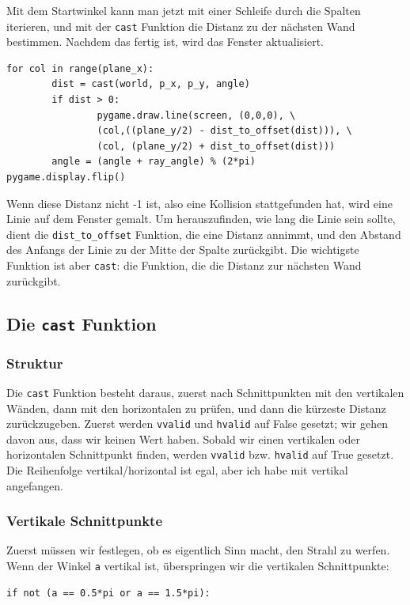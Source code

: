 \documentclass[a4paper,12pt]{report}
\begin{document}
Mit dem Startwinkel kann man jetzt mit einer Schleife durch die Spalten iterieren, und mit der \texttt{cast} Funktion die Distanz zu der n\"achsten Wand bestimmen. Nachdem das fertig ist, wird das Fenster aktualisiert.
\begin{Verbatim}[baselinestretch=1.0, xleftmargin=1cm]
for col in range(plane_x):
        dist = cast(world, p_x, p_y, angle)
        if dist > 0:
                pygame.draw.line(screen, (0,0,0), \
                (col,((plane_y/2) - dist_to_offset(dist))), \
                (col, (plane_y/2) + dist_to_offset(dist)))
        angle = (angle + ray_angle) % (2*pi)
pygame.display.flip()
\end{Verbatim}
Wenn diese Distanz nicht -1 ist, also eine Kollision stattgefunden hat, wird eine Linie auf dem Fenster gemalt. Um herauszufinden, wie lang die Linie sein sollte, dient die \texttt{dist\_to\_offset} Funktion, die eine Distanz annimmt, und den Abstand des Anfangs der Linie zu der Mitte der Spalte zur\"uckgibt. Die wichtigste Funktion ist aber \texttt{cast}: die Funktion, die die Distanz zur n\"achsten Wand zur\"uckgibt.

\subsection{Die \texttt{cast} Funktion}
\subsubsection{Struktur}
Die \texttt{cast} Funktion besteht daraus, zuerst nach Schnittpunkten mit den vertikalen W\"anden, dann mit den horizontalen zu pr\"ufen, und dann die k\"urzeste Distanz zur\"uckzugeben. Zuerst werden \texttt{vvalid} und \texttt{hvalid} auf False gesetzt; wir gehen davon aus, dass wir keinen Wert haben. Sobald wir einen vertikalen oder horizontalen Schnittpunkt finden, werden \texttt{vvalid} bzw. \texttt{hvalid} auf True gesetzt. \\
Die Reihenfolge vertikal/horizontal ist egal, aber ich habe mit vertikal angefangen.
\subsubsection{Vertikale Schnittpunkte}
Zuerst m\"ussen wir festlegen, ob es eigentlich Sinn macht, den Strahl zu werfen. Wenn der Winkel \texttt{a} vertikal ist, \"uberspringen wir die vertikalen Schnittpunkte:
\begin{Verbatim}[baselinestretch=1.0, xleftmargin=1cm]
if not (a == 0.5*pi or a == 1.5*pi):
\end{Verbatim}
\end{document}
